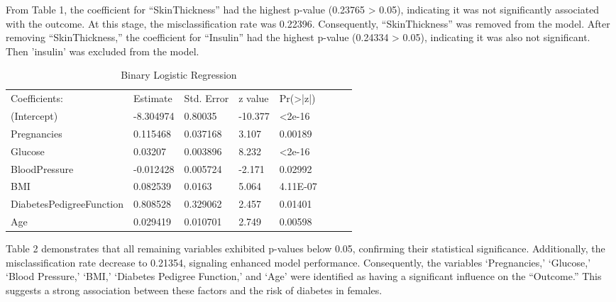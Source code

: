 \documentclass[12pt]{article}
\begin{document}
From Table 1, the coefficient for “SkinThickness” had the highest p-value (0.23765 > 0.05), indicating it was not significantly associated with the outcome. At this stage, the misclassification rate was 0.22396. Consequently, “SkinThickness” was removed from the model. After removing “SkinThickness,” the coefficient for “Insulin” had the highest p-value (0.24334 > 0.05), indicating it was also not significant. Then 'insulin' was excluded from the model.\\
\begin{table}[H]
\centering
\begin{tabular}{llllllll}
\cline{1-5}
\multicolumn{1}{|l|}{Coefficients:}            & \multicolumn{1}{l|}{Estimate}  & \multicolumn{1}{l|}{Std. Error} & \multicolumn{1}{l|}{z value} & \multicolumn{1}{l|}{Pr(\textgreater{}|z|)} &  &  &  \\ \cline{1-5}
\multicolumn{1}{|l|}{(Intercept)}              & \multicolumn{1}{l|}{-8.304974} & \multicolumn{1}{l|}{0.80035}    & \multicolumn{1}{l|}{-10.377} & \multicolumn{1}{l|}{\textless 2e-16}       &  &  &  \\ \cline{1-5}
\multicolumn{1}{|l|}{Pregnancies}              & \multicolumn{1}{l|}{0.115468}  & \multicolumn{1}{l|}{0.037168}   & \multicolumn{1}{l|}{3.107}   & \multicolumn{1}{l|}{0.00189}               &  &  &  \\ \cline{1-5}
\multicolumn{1}{|l|}{Glucose}                  & \multicolumn{1}{l|}{0.03207}   & \multicolumn{1}{l|}{0.003896}   & \multicolumn{1}{l|}{8.232}   & \multicolumn{1}{l|}{\textless 2e-16}       &  &  &  \\ \cline{1-5}
\multicolumn{1}{|l|}{BloodPressure}            & \multicolumn{1}{l|}{-0.012428} & \multicolumn{1}{l|}{0.005724}   & \multicolumn{1}{l|}{-2.171}  & \multicolumn{1}{l|}{0.02992}               &  &  &  \\ \cline{1-5}
\multicolumn{1}{|l|}{BMI}                      & \multicolumn{1}{l|}{0.082539}  & \multicolumn{1}{l|}{0.0163}     & \multicolumn{1}{l|}{5.064}   & \multicolumn{1}{l|}{4.11E-07}              &  &  &  \\ \cline{1-5}
\multicolumn{1}{|l|}{DiabetesPedigreeFunction} & \multicolumn{1}{l|}{0.808528}  & \multicolumn{1}{l|}{0.329062}   & \multicolumn{1}{l|}{2.457}   & \multicolumn{1}{l|}{0.01401}               &  &  &  \\ \cline{1-5}
\multicolumn{1}{|l|}{Age}                      & \multicolumn{1}{l|}{0.029419}  & \multicolumn{1}{l|}{0.010701}   & \multicolumn{1}{l|}{2.749}   & \multicolumn{1}{l|}{0.00598}               &  &  &  \\ \cline{1-5}
\end{tabular}
\caption{Binary Logistic Regression }
\end{table}
Table 2 demonstrates that all remaining variables exhibited p-values below 0.05, confirming their statistical significance. Additionally, the misclassification rate decrease to 0.21354, signaling enhanced model performance. Consequently, the variables ‘Pregnancies,’ ‘Glucose,’ ‘Blood Pressure,’ ‘BMI,’ ‘Diabetes Pedigree Function,’ and ‘Age’ were identified as having a significant influence on the “Outcome.” This suggests a strong association between these factors and the risk of diabetes in females.
\end{document}
